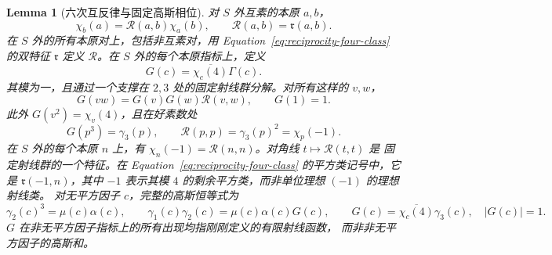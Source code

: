 \documentclass[11pt,a4paper]{article}
\numberwithin{equation}{section}
\numberwithin{figure}{section}
\newtheorem{lemma}[theorem]{Lemma}
\theoremstyle{definition}
\theoremstyle{remark}
\begin{document}
\begin{lemma}[六次互反律与固定高斯相位]
\label{lem:fixed-gauss-phase}
对 $S$ 外互素的本原 $a,b$，
\[
 \chi_b(a)=\mathcal R(a,b)\chi_a(b),\qquad
 \mathcal R(a,b)=\mathfrak r(a,b).
\]
在 $S$ 外的所有本原对上，包括非互素对，用
Equation~\eqref{eq:reciprocity-four-class} 的双特征 $\mathfrak r$ 定义
$\mathcal R$。在 $S$ 外的每个本原指标上，定义
\[
 G(c)=\overline{\chi_c(4)}\Gamma(c).
\]
其模为一，且通过一个支撑在 $2,3$ 处的固定射线群分解。对所有这样的 $v,w$，
\begin{equation}\label{eq:G-quadratic-refinement}
 G(vw)=G(v)G(w)\mathcal R(v,w),\qquad G(1)=1.
\end{equation}
此外 $G(v^2)=\chi_v(4)$，且在好素数处
\begin{equation}\label{eq:fixed-gauss-phases}
 G(p^3)=\gamma_3(p),\qquad
 \mathcal R(p,p)=\gamma_3(p)^2=\chi_p(-1).
\end{equation}
在 $S$ 外的每个本原 $n$ 上，有
$\chi_n(-1)=\mathcal R(n,n)$。对角线 $t\mapsto\mathcal R(t,t)$ 是
固定射线群的一个特征。在
Equation~\eqref{eq:reciprocity-four-class} 的平方类记号中，它是
$\mathfrak r(-1,n)$，其中 $-1$ 表示其模 $4$ 的剩余平方类，而非单位理想
$(-1)$ 的理想射线类。
对无平方因子 $c$，完整的高斯恒等式为
\begin{equation}\label{eq:signal}
 \gamma_2(c)^3=\mu(c)\alpha(c),\qquad
 \gamma_1(c)\gamma_2(c)=\mu(c)\alpha(c)G(c),\qquad
 G(c)=\overline{\chi_c(4)}\gamma_3(c),\quad |G(c)|=1.
\end{equation}
$G$ 在非无平方因子指标上的所有出现均指刚刚定义的有限射线函数，
而非非无平方因子的高斯和。
\end{lemma}
\end{document}
